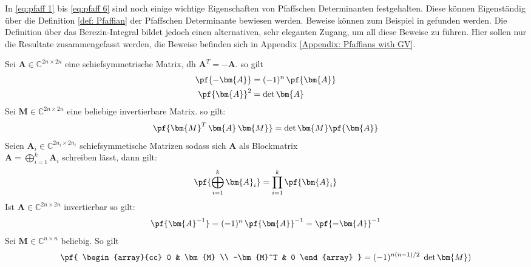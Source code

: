 \noindent In \eqref{eq:pfaff 1} bis \eqref{eq:pfaff 6} sind noch einige wichtige Eigenschaften von Pfaffschen Determinanten festgehalten. Diese können Eigenständig über die Definition \eqref{def: Pfaffian} der Pfaffschen Determinante bewiesen werden. Beweise können zum Beispiel in \cite{Haber2009NotesOA} gefunden werden. Die Definition über das Berezin-Integral bildet jedoch einen alternativen, sehr eleganten Zugang, um all diese Beweise zu führen. Hier sollen nur die Resultate zusammengefasst werden, die Beweise befinden sich in Appendix \ref{Appendix: Pfaffians with GV}.
\newpage
\begin{grayframe}[frametitle = {Eigenschaften von Pfaffschen Determinanten}]
    Sei $\bm{A} \in \mathbb{C}^{2n\times2n}$ eine schiefsymmetrische Matrix, dh $\bm{A}^T = -\bm{A}$. so gilt
        \begin{align}
            \pf{-\bm{A}} &= (-1)^n\, \pf{\bm{A}} \label{eq:pfaff 1}\\
            \pf{\bm{A}}^2 &= \det{\bm{A}}      \label{eq:pfaff 2}
        \end{align}
    Sei $\bm{M} \in \mathbb{C}^{2n\times2n} $ eine beliebige invertierbare Matrix. so gilt:
        \begin{equation}
            \pf{\bm{M}^T \,\bm{A}\, \bm{M}} = \det{\bm{M}} \pf{\bm{A}} \label{eq:pfaff 3}
        \end{equation}
    Seien $\bm{A}_i \in \mathbb{C}^{2n_i\times2n_i}$ schiefsymmetische Matrizen sodass sich $\bm{A}$ als Blockmatrix \\
    ${\bm{A} = \bigoplus_{i = 1}^k \bm{A}_i}$ schreiben lässt, dann gilt:
        \begin{equation}
            \pf{\bigoplus_{i = 1}^k \bm{A}_i} = \prod_{i=1}^k \pf{\bm{A}_i} \label{eq:pfaff 4}
        \end{equation}
    Ist $\bm{A} \in \mathbb{C}^{2n\times2n}$ invertierbar so gilt:
        \begin{equation}
        \pf{\bm{A}^{-1}} = (-1)^n\, \pf{\bm{A}}^{-1} = \pf{-\bm{A}}^{-1} \label{eq:pfaff 5}
        \end{equation}
    Sei $\bm{M} \in \mathbb{C}^{n\times n} $ beliebig. So gilt
        \begin{equation}
            \pf{
                \begin{array}{cc}
                    0    & \bm{M} \\
                    -\bm{M}^T & 0 
                \end{array}
            } = (-1)^{n(n-1)/2} \; \det{\bm{M})} \label{eq:pfaff 6}
        \end{equation}
\end{grayframe}

